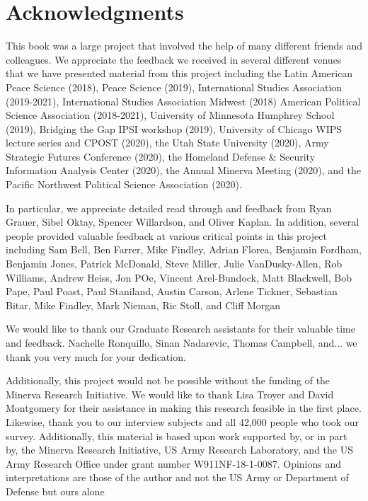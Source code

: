 
\section*{Acknowledgments}

This book was a large project that involved the help of many different friends and colleagues. We appreciate the feedback we received in several different venues that we have presented material from this project including the Latin American Peace Science (2018), Peace Science (2019), International Studies Association (2019-2021), International Studies Association Midwest (2018) American Political Science Association (2018-2021), University of Minnesota Humphrey School (2019), Bridging the Gap IPSI workshop (2019), University of Chicago WIPS lecture series and CPOST (2020), the Utah State University (2020), Army Strategic Futures Conference (2020), the Homeland Defense \& Security Information Analysis Center (2020), the Annual Minerva Meeting (2020),  and the Pacific Northwest Political Science Association (2020).

In particular, we appreciate detailed read through and feedback from Ryan Grauer, Sibel Oktay, Spencer Willardson, and Oliver Kaplan. In addition, several people provided valuable feedback at various critical points in this project including Sam Bell, Ben Farrer, Mike Findley, Adrian Florea, Benjamin Fordham, Benjamin Jones, Patrick McDonald, Steve Miller, Julie VanDusky-Allen, Rob Williams, Andrew Heiss, Jon POe, Vincent Arel-Bundock, Matt Blackwell, Bob Pape, Paul Poast, Paul Staniland, Austin Carson, Arlene Tickner, Sebastian Bitar, Mike Findley, Mark Nieman, Ric Stoll, and Cliff Morgan

We would like to thank our Graduate Research assistants for their valuable time and feedback. Nachelle Ronquillo, Sinan Nadarevic, Thomas Campbell, and... we thank you very much for your dedication.

Additionally, this project would not be possible without the funding of the Minerva Research Initiative. We would like to thank Lisa Troyer and David Montgomery for their assistance in making this research feasible in the first place. Likewise, thank you to our interview subjects and all 42,000 people who took our survey. Additionally, this material is based upon work supported by, or in part by, the Minerva Research Initiative, US Army Research Laboratory, and the US Army Research Office under grant number W911NF-18-1-0087. Opinions and interpretations are those of the author and not the US Army or Department of Defense but ours alone





